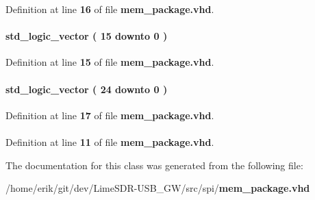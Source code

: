 Definition at line {\bf 16} of file {\bf mem\+\_\+package.\+vhd}.

\paragraph[{mword16}]{ {\bfseries \textcolor{comment}{std\+\_\+logic\+\_\+vector}\textcolor{vhdlchar}{ }\textcolor{vhdlchar}{(}\textcolor{vhdlchar}{ }\textcolor{vhdlchar}{ } \textcolor{vhdldigit}{15} \textcolor{vhdlchar}{ }\textcolor{keywordflow}{downto}\textcolor{vhdlchar}{ }\textcolor{vhdlchar}{ } \textcolor{vhdldigit}{0} \textcolor{vhdlchar}{ }\textcolor{vhdlchar}{)}\textcolor{vhdlchar}{ }} \hspace{0.3cm}{\ttfamily [Subtype]}}\label{classmem__package_af45008efd5e5e5cdaa91396f2648cd73}


Definition at line {\bf 15} of file {\bf mem\+\_\+package.\+vhd}.

\paragraph[{mword25}]{ {\bfseries \textcolor{comment}{std\+\_\+logic\+\_\+vector}\textcolor{vhdlchar}{ }\textcolor{vhdlchar}{(}\textcolor{vhdlchar}{ }\textcolor{vhdlchar}{ } \textcolor{vhdldigit}{24} \textcolor{vhdlchar}{ }\textcolor{keywordflow}{downto}\textcolor{vhdlchar}{ }\textcolor{vhdlchar}{ } \textcolor{vhdldigit}{0} \textcolor{vhdlchar}{ }\textcolor{vhdlchar}{)}\textcolor{vhdlchar}{ }} \hspace{0.3cm}{\ttfamily [Subtype]}}\label{classmem__package_a8acc2342f24c042dffcd95cd896bf8d4}


Definition at line {\bf 17} of file {\bf mem\+\_\+package.\+vhd}.

\paragraph[{std\+\_\+logic\+\_\+1164}]{\hspace{0.3cm}{\ttfamily [Package]}}\label{classmem__package_acd03516902501cd1c7296a98e22c6fcb}


Definition at line {\bf 11} of file {\bf mem\+\_\+package.\+vhd}.



The documentation for this class was generated from the following file\+:\begin{DoxyCompactItemize}
\item 
/home/erik/git/dev/\+Lime\+S\+D\+R-\/\+U\+S\+B\+\_\+\+G\+W/src/spi/{\bf mem\+\_\+package.\+vhd}\end{DoxyCompactItemize}
